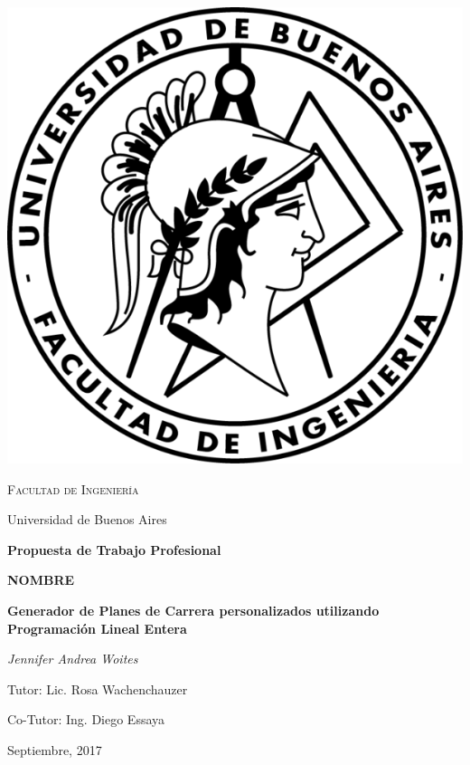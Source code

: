 \documentclass[a4paper]{article}
\begin{document}

\begin{titlepage}
	\centering
	\includegraphics{Imagenes/logo_fiuba.png}\par\vspace{1cm}
	{\scshape\LARGE Facultad de Ingeniería \par
	Universidad de Buenos Aires  \par}
	\vspace{1.5cm}
	{\Large\bfseries Propuesta de Trabajo Profesional\par}
	\vspace{1.5cm}
	{\huge\bfseries NOMBRE \par}
	\vspace{0.5cm}
	{\huge\bfseries Generador de Planes de Carrera personalizados utilizando Programación Lineal Entera \par}
	\vspace{1cm}
	{\Large\itshape Jennifer Andrea Woites\par}
	\vfill
	{\Large
	Tutor: Lic. Rosa Wachenchauzer \par
	\vspace{0.3cm}
	Co-Tutor: Ing. Diego Essaya}
	\vfill
	{\large Septiembre, 2017 \par}
\end{titlepage}
\end{document}
